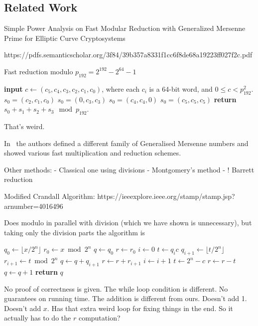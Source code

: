 
\subsection{Related Work}

Simple Power Analysis on Fast Modular Reduction with
Generalized Mersenne Prime for Elliptic Curve Cryptosystems

https://pdfs.semanticscholar.org/3f84/39b357a8331f1cc6f8de68a19223ff027f2c.pdf

\begin{algorithm}
   \caption{Fast reduction modulo $p_{192} = 2^{192} - 2^{64} - 1$}
   \begin{algorithmic}
      \State \textbf{input} $c \gets (c_5, c_4, c_3, c_2, c_1, c_0)$, where each $c_i$ is a 64-bit word, and $0 \le c < p^2_{192}$.
      \State $s_0 = (c_2, c_1, c_0)$
      \State $s_0 = (0, c_3, c_3)$
      \State $s_0 = (c_4, c_4, 0)$
      \State $s_0 = (c_5, c_5, c_5)$
      \State \textbf{return} $s_0 + s_1 + s_2 + s_3 \mod p_{192}$.
   \end{algorithmic}
\end{algorithm}
That's weird.

In~\cite{granger2013generalised} the authors defined a different family of Generalised Mersenne numbers and showed various fast multiplication and reduction schemes.

Other methods:
 - Classical one using divisions
 - Montgomery's method
 - ! Barrett reduction

Modified Crandall Algorithm:
https://ieeexplore.ieee.org/stamp/stamp.jsp?arnumber=4016496

Does modulo in parallel with division (which we have shown is unnecessary), but taking only the division parts the algorithm is
\begin{algorithm}
   \begin{algorithmic}[1]
         \State $q_0 \gets \lfloor x/2^n\rfloor$
         \State $r_0 \gets x \bmod 2^n$
         \State $q \gets q_0$
         \State $r \gets r_0$
         \State $i \gets 0$
            \State $t \gets q_i c$
            \State $q_{i+1} \gets \lfloor t / 2^n\rfloor$
            \State $r_{i+1} \gets t \bmod 2^n$
            \State $q\gets q+q_{i+1}$
            \State $r\gets r+r_{i+1}$
            \State $i\gets i+1$
         \EndWhile
         \State $t \gets 2^n-c$
            \State $r\gets r-t$
            \State $q\gets q+1$
         \EndWhile
         \State\textbf{return} $q$
      \EndProcedure
   \end{algorithmic}
\end{algorithm}

No proof of correctness is given.
The while loop condition is different.
No guarantees on running time.
The addition is different from ours.
Doesn't add 1. Doesn't add $x$.
Has that extra weird loop for fixing things in the end.
So it actually has to do the $r$ computation?
